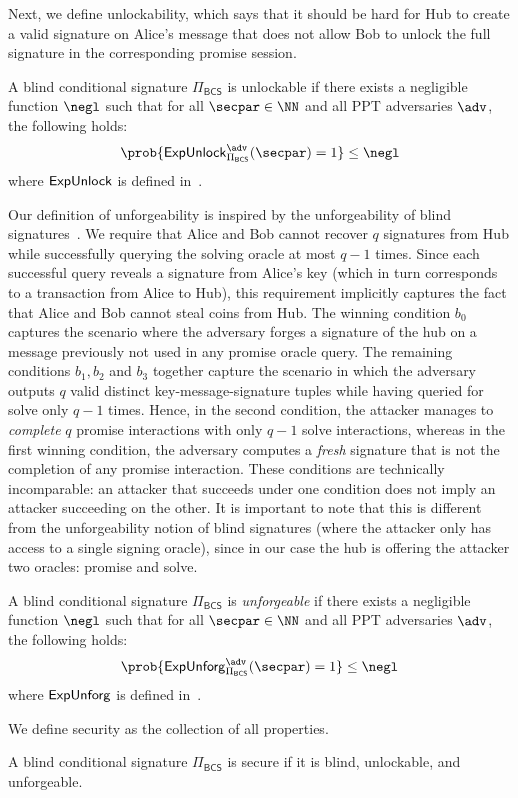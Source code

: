 

Next, we define unlockability, which says that it should be hard for Hub to create a valid signature on Alice's message that does not allow Bob to unlock the full signature in the corresponding promise session.

\begin{definition}[Unlockability]
A blind conditional signature $\Pi_\mathsf{BCS}$ is unlockable if there exists a negligible function $\negl$ such that for all $\secpar \in \NN$ and all PPT adversaries $\adv$, the following holds:
\[ \prob{\expUnlock^{\adv}_{\Pi_{\mathsf{BCS}}}(\secpar) = 1} \le \negl\]
where $\mathsf{ExpUnlock}$ is defined in~.
\end{definition}



Our definition of unforgeability is inspired by the unforgeability of blind signatures~\cite{C:Chaum82}. We require that Alice and Bob cannot recover $q$ signatures from Hub while successfully querying the solving oracle at most $q-1$ times. Since each successful query reveals a signature from Alice's key (which in turn corresponds to a transaction from Alice to Hub), this requirement implicitly captures the fact that Alice and Bob cannot steal coins from Hub. The winning condition $b_0$ captures the scenario where the adversary forges a signature of the hub on a message previously not used in any promise oracle query.
The remaining conditions $b_1, b_2$ and $b_3$ together capture the scenario in which the adversary outputs $q$ valid distinct key-message-signature tuples while having queried for solve only $q-1$ times. Hence, in the second condition, the attacker manages to \emph{complete} $q$ promise interactions with only $q-1$ solve interactions, whereas in the first winning condition, the adversary computes a \emph{fresh} signature that is not the completion of any promise interaction. These conditions are technically incomparable: an attacker that succeeds under one condition does not imply an attacker succeeding on the other.
It is important to note that this is different from the unforgeability notion of blind signatures (where the attacker only has access to a single signing oracle), since in our case the hub is offering the attacker two oracles: promise and solve.

\begin{definition}[Unforgeability]
A blind conditional signature $\Pi_\mathsf{BCS}$ is \emph{unforgeable} if there exists a negligible function $\negl$ such that for all $\secpar \in \NN$ and all PPT adversaries $\adv$, the following holds:
\begin{equation*}
     \prob{\expSec^{\adv}_{\Pi_{\mathsf{BCS}}}(\secpar) = 1} \le \negl
\end{equation*}
where $\mathsf{ExpUnforg}$ is defined in~.
\end{definition}



We define security as the collection of all properties.
\begin{definition}[Security]
A blind conditional signature $\Pi_\mathsf{BCS}$ is secure if it is blind, unlockable, and unforgeable.
\end{definition}